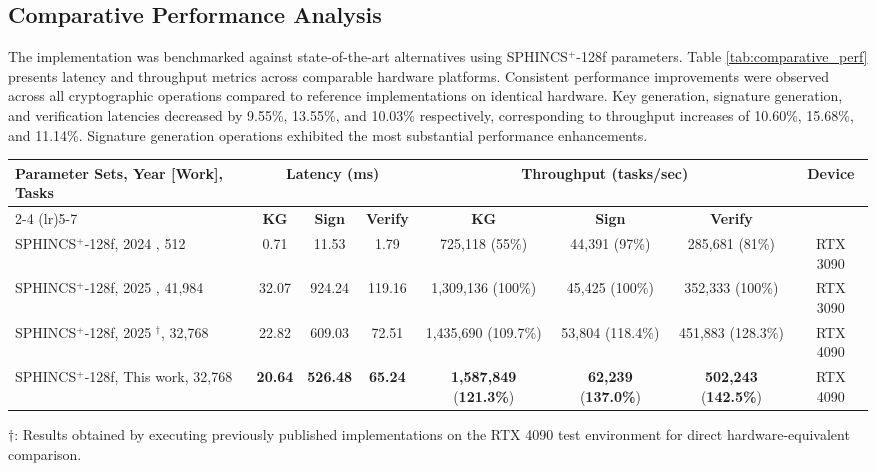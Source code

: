 \documentclass[journal]{IEEEtran}
\begin{document}
\subsection{Comparative Performance Analysis}

The implementation was benchmarked against state-of-the-art alternatives using SPHINCS$^+$-128f parameters. Table \ref{tab:comparative_perf} presents latency and throughput metrics across comparable hardware platforms.
Consistent performance improvements were observed across all cryptographic operations compared to reference implementations on identical hardware. Key generation, signature generation, and verification latencies decreased by 9.55\%, 13.55\%, and 10.03\% respectively, corresponding to throughput increases of 10.60\%, 15.68\%, and 11.14\%. Signature generation operations exhibited the most substantial performance enhancements.

\begin{table*}[htpb]
  \centering
  \caption{Performance Comparison of SLH-DSA Implementations}
  \label{tab:comparative_perf}
  \begin{tabular}{@{}lccccccc@{}}
    \toprule
    \multirow{2}{*}{\textbf{Parameter Sets, Year [Work], Tasks}} & \multicolumn{3}{c}{\textbf{Latency (ms)}} & \multicolumn{3}{c}{\textbf{Throughput (tasks/sec)}} & \multirow{2}{*}{\textbf{Device}} \\
    \cmidrule(lr){2-4} \cmidrule(lr){5-7}
    & \textbf{KG} & \textbf{Sign} & \textbf{Verify} & \textbf{KG} & \textbf{Sign} & \textbf{Verify} & \\
    \midrule
    SPHINCS$^+$-128f, 2024 \cite{Kim2024}, 512  & 0.71 & 11.53 & 1.79 & 725,118 (55\%) & 44,391 (97\%) & 285,681 (81\%) & RTX 3090 \\
    SPHINCS$^+$-128f, 2025 \cite{Wang2025}, 41,984 & 32.07 & 924.24 & 119.16 & 1,309,136 (100\%) & 45,425 (100\%) & 352,333 (100\%) & RTX 3090 \\
    SPHINCS$^+$-128f, 2025 \cite{Wang2025}$^\dagger$, 32,768 & 22.82 & 609.03 & 72.51 & 1,435,690 (109.7\%) & 53,804 (118.4\%) & 451,883 (128.3\%) & RTX 4090 \\
    SPHINCS$^+$-128f, This work, 32,768 & \textbf{20.64} & \textbf{526.48} & \textbf{65.24} & \textbf{1,587,849} (\textbf{121.3\%}) & \textbf{62,239} (\textbf{137.0\%}) & \textbf{502,243} (\textbf{142.5\%}) & RTX 4090 \\
    \bottomrule
  \end{tabular}
  \begin{tablenotes}
  \item[] $\dagger$: Results obtained by executing previously published implementations on the RTX 4090 test environment for direct hardware-equivalent comparison.
  \end{tablenotes}
\end{table*}
\end{document}
